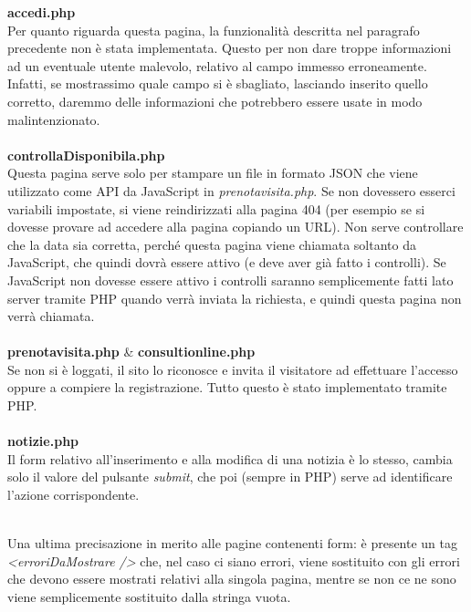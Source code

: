 \textbf{accedi.php} \\ 
Per quanto riguarda questa pagina, la funzionalità descritta nel paragrafo precedente non è stata implementata. Questo per non dare troppe informazioni ad un eventuale utente malevolo, relativo al campo immesso erroneamente. Infatti, se mostrassimo quale campo si è sbagliato, lasciando inserito quello corretto, daremmo delle informazioni che potrebbero essere usate in modo malintenzionato. \\ \\

\textbf{controllaDisponibila.php} \\
Questa pagina serve solo per stampare un file in formato JSON che viene utilizzato come API da JavaScript in \textit{prenotavisita.php}. Se non dovessero esserci variabili impostate, si viene reindirizzati alla pagina 404 (per esempio se si dovesse provare ad accedere alla pagina copiando un URL).
Non serve controllare che la data sia corretta, perché questa pagina viene chiamata soltanto da JavaScript, che quindi dovrà essere attivo (e deve aver già fatto i controlli).
Se JavaScript non dovesse essere attivo i controlli saranno semplicemente fatti lato server tramite PHP quando verrà inviata la richiesta, e quindi questa pagina non verrà chiamata. \\ \\

\textbf{prenotavisita.php} \& \textbf{consultionline.php} \\
Se non si è loggati, il sito lo riconosce e invita il visitatore ad effettuare l'accesso oppure a compiere la registrazione. Tutto questo è stato implementato tramite PHP. \\ \\

\textbf{notizie.php} \\
Il form relativo all'inserimento e alla modifica di una notizia è lo stesso, cambia solo il valore del pulsante \textit{submit}, che poi (sempre in PHP) serve ad identificare l'azione corrispondente. \\ \\

\bigskip
\bigskip

Una ultima precisazione in merito alle pagine contenenti form: è presente un tag \textit{<erroriDaMostrare />} che, nel caso ci siano errori, viene sostituito con gli errori che devono essere mostrati  relativi alla singola pagina, mentre se non ce ne sono viene semplicemente sostituito dalla stringa vuota.







